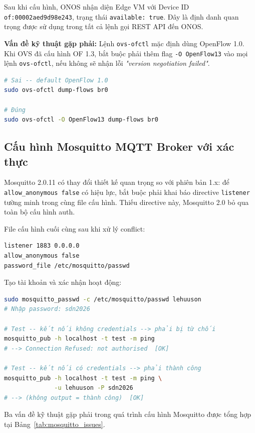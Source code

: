 Sau khi cấu hình, ONOS nhận diện Edge VM với Device ID \texttt{of:00002aed9d98e243}, trạng thái \texttt{available: true}. Đây là định danh quan trọng được sử dụng trong tất cả lệnh gọi REST API đến ONOS.

\textbf{Vấn đề kỹ thuật gặp phải:} Lệnh \texttt{ovs-ofctl} mặc định dùng OpenFlow 1.0. Khi OVS đã cấu hình OF 1.3, bắt buộc phải thêm flag \texttt{-O OpenFlow13} vào mọi lệnh \texttt{ovs-ofctl}, nếu không sẽ nhận lỗi \textit{"version negotiation failed"}.

\begin{lstlisting}[language=bash, caption={Xem flow rules trên OVS (OpenFlow 1.3)}]
# Sai -- default OpenFlow 1.0
sudo ovs-ofctl dump-flows br0

# Đúng
sudo ovs-ofctl -O OpenFlow13 dump-flows br0
\end{lstlisting}

\subsection{Cấu hình Mosquitto MQTT Broker với xác thực}

Mosquitto 2.0.11 có thay đổi thiết kế quan trọng so với phiên bản 1.x: để \texttt{allow\_anonymous false} có hiệu lực, bắt buộc phải khai báo directive \texttt{listener} tường minh trong cùng file cấu hình. Thiếu directive này, Mosquitto 2.0 bỏ qua toàn bộ cấu hình auth.

File cấu hình cuối cùng sau khi xử lý conflict:
\begin{lstlisting}[caption={/etc/mosquitto/conf.d/auth.conf — cấu hình bảo mật}]
listener 1883 0.0.0.0
allow_anonymous false
password_file /etc/mosquitto/passwd
\end{lstlisting}

Tạo tài khoản và xác nhận hoạt động:
\begin{lstlisting}[language=bash, caption={Tạo tài khoản MQTT và kiểm tra xác thực}]
sudo mosquitto_passwd -c /etc/mosquitto/passwd lehuuson
# Nhập password: sdn2026

# Test -- kết nối không credentials --> phải bị từ chối
mosquitto_pub -h localhost -t test -m ping
# --> Connection Refused: not authorised  [OK]

# Test -- kết nối có credentials --> phải thành công
mosquitto_pub -h localhost -t test -m ping \
              -u lehuuson -P sdn2026
# --> (không output = thành công)  [OK]
\end{lstlisting}

Ba vấn đề kỹ thuật gặp phải trong quá trình cấu hình Mosquitto được tổng hợp tại Bảng~\ref{tab:mosquitto_issues}.

